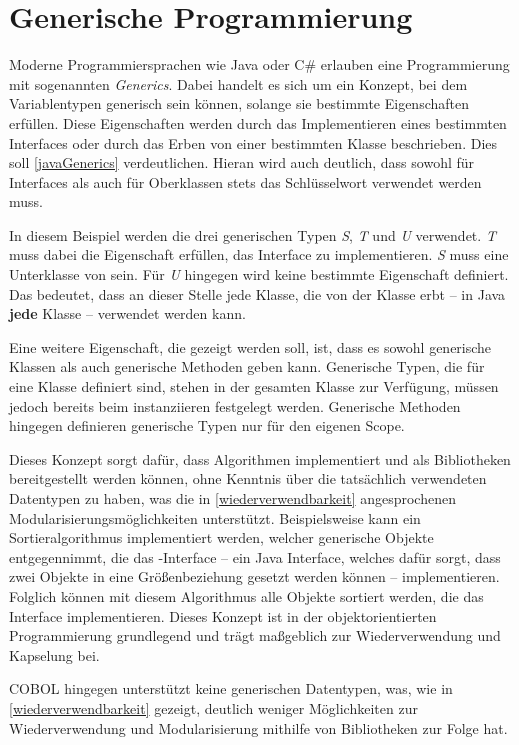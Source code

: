 \section{Generische Programmierung}
Moderne Programmiersprachen wie Java oder C\# erlauben eine Programmierung mit sogenannten \textit{Generics}. Dabei handelt es sich um ein Konzept, bei dem Variablentypen generisch sein können, solange sie bestimmte Eigenschaften erfüllen. Diese Eigenschaften werden durch das Implementieren eines bestimmten Interfaces oder durch das Erben von einer bestimmten Klasse beschrieben. Dies soll \autoref{javaGenerics} verdeutlichen. Hieran wird auch deutlich, dass sowohl für Interfaces als auch für Oberklassen stets das Schlüsselwort  verwendet werden muss.


In diesem Beispiel werden die drei generischen Typen \textit{S}, \textit{T} und \textit{U} verwendet. \textit{T} muss dabei die Eigenschaft erfüllen, das  Interface zu implementieren. \textit{S} muss eine Unterklasse von  sein. Für \textit{U} hingegen wird keine bestimmte Eigenschaft definiert. Das bedeutet, dass an dieser Stelle jede Klasse, die von der Klasse  erbt -- in Java \textbf{jede} Klasse -- verwendet werden kann. 

Eine weitere Eigenschaft, die gezeigt werden soll, ist, dass es sowohl generische Klassen als auch generische Methoden geben kann. Generische Typen, die für eine Klasse definiert sind, stehen in der gesamten Klasse zur Verfügung, müssen jedoch bereits beim instanziieren festgelegt werden. Generische Methoden hingegen definieren generische Typen nur für den eigenen Scope.

Dieses Konzept sorgt dafür, dass Algorithmen implementiert und als Bibliotheken bereitgestellt werden können, ohne Kenntnis über die tatsächlich verwendeten Datentypen zu haben, was die in \autoref{wiederverwendbarkeit} angesprochenen Modularisierungsmöglichkeiten unterstützt. Beispielsweise kann ein Sortieralgorithmus implementiert werden, welcher generische Objekte entgegennimmt, die das -Interface -- ein Java Interface, welches dafür sorgt, dass zwei Objekte in eine Größenbeziehung gesetzt werden können -- implementieren. Folglich können mit diesem Algorithmus alle Objekte sortiert werden, die das Interface implementieren. Dieses Konzept ist in der objektorientierten Programmierung grundlegend und trägt maßgeblich zur Wiederverwendung und Kapselung bei.

COBOL hingegen unterstützt keine generischen Datentypen, was, wie in \autoref{wiederverwendbarkeit} gezeigt, deutlich weniger Möglichkeiten zur Wiederverwendung und Modularisierung mithilfe von Bibliotheken zur Folge hat.